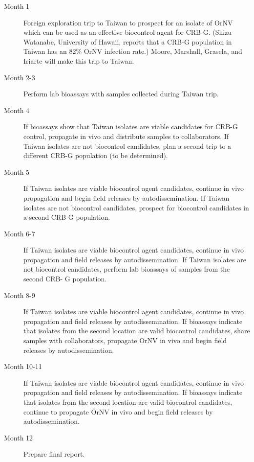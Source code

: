 \documentclass[14pt,english,letterpaper]{scrartcl}
\begin{document}
\begin{description}

\item [Month 1] Foreign exploration trip to Taiwan to prospect for an isolate of OrNV which can be used as an effective
biocontrol agent for CRB-G. (Shizu Watanabe, University of Hawaii, reports that a CRB-G population in
Taiwan has an 82\% OrNV infection rate.) Moore, Marshall, Grasela, and Iriarte will make this trip to
Taiwan.

\item[Month 2-3] Perform lab bioassays with samples collected during Taiwan trip.

\item[Month 4] If bioassays show that Taiwan isolates are viable candidates for CRB-G control, propagate in vivo and
distribute samples to collaborators.
If Taiwan isolates are not biocontrol candidates, plan a second trip to a different CRB-G population (to be
determined).

\item[Month 5] If Taiwan isolates are viable biocontrol agent candidates, continue in vivo propagation and begin field
releases by autodissemination.
If Taiwan isolates are not biocontrol candidates, prospect for biocontrol candidates in a second CRB-G
population.

\item[Month 6-7] If Taiwan isolates are viable biocontrol agent candidates, continue in vivo propagation and field releases
by autodissemination.
If Taiwan isolates are not biocontrol candidates, perform lab bioassays of samples from the second CRB-
G population.

\item[Month 8-9] If Taiwan isolates are viable biocontrol agent candidates, continue in vivo propagation and field releases
by autodissemination.
If bioassays indicate that isolates from the second location are valid biocontrol candidates, share samples
with collaborators, propagate OrNV in vivo and begin field releases by autodissemination.

\item[Month 10-11] If Taiwan isolates are viable biocontrol agent candidates, continue in vivo propagation and field releases
by autodissemination.
If bioassays indicate that isolates from the second location are valid biocontrol candidates, continue to
propagate OrNV in vivo and begin field releases by autodissemination.

\item[Month 12] Prepare final report.
\end{description}
\end{document}
